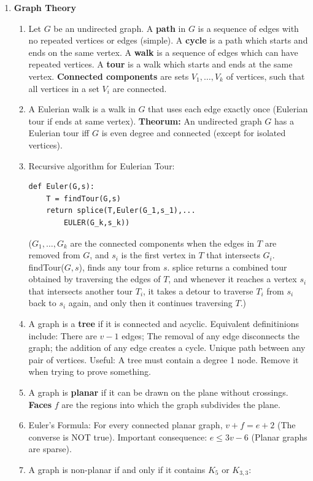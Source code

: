 \documentclass[10pt]{article}
\begin{document}
\begin{multicols}{2}
\begin{enumerate}
    \item \textbf{Graph Theory} 
    \begin{enumerate}
        \item Let $G$ be an undirected graph. A \textbf{path} in $G$ is a sequence of edges with no repeated vertices or edges (simple). A \textbf{cycle} is a path which starts and ends on the same vertex. A \textbf{walk} is a sequence of edges which can have repeated vertices. A \textbf{tour} is a walk which starts and ends at the same vertex. \textbf{Connected components} are sets $V_1,\hdots,V_k$ of vertices, such that all vertices in a set $V_i$ are connected.
        \item A Eulerian walk is a walk in $G$ that uses each edge exactly once (Eulerian tour if ends at same vertex). \textbf{Theorum:} An undirected graph $G$ has a Eulerian tour iff $G$ is even degree and connected (except for isolated vertices). 
        \item Recursive algorithm for Eulerian Tour:
        \begin{verbatim}
def Euler(G,s): 
    T = findTour(G,s) 
    return splice(T,Euler(G_1,s_1),...
        EULER(G_k,s_k))
        \end{verbatim}
        ($G_1, \hdots,G_k$ are the connected components when the edges in $T$ are removed from $G$, and $s_i$ is the first vertex in $T$ that intersects $G_i$. findTour($G,s$), finds any tour from $s$. splice returns a combined tour obtained by traversing the edges of $T$, and whenever it reaches a vertex $s_i$ that intersects another tour $T_i$, it takes a detour to traverse $T_i$ from $s_i$ back to $s_i$ again, and only then it continues traversing $T$.)
        \item A graph is a \textbf{tree} if it is connected and acyclic. Equivalent definitinions include: There are $v-1$ edges; The removal of any edge disconnects the graph; the addition of any edge creates a cycle. Unique path between any pair of vertices. Useful: A tree must contain a degree 1 node. Remove it when trying to prove something.
        \item A graph is \textbf{planar} if it can be drawn on the plane without crossings. \textbf{Faces} $f$ are the regions into which the graph subdivides the plane. 
        \item Euler's Formula: For every connected planar graph, $v+f=e+2$ (The converse is NOT true). Important consequence: $e \leq 3v-6$ (Planar graphs are sparse).
        \item A graph is non-planar if and only if it contains $K_5$ or $K_{3,3}:$

\end{enumerate}
\end{enumerate}
\end{multicols}
\end{document}
